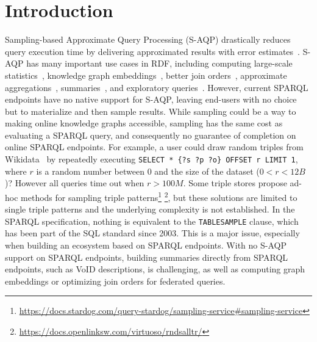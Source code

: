 
\section{Introduction}

Sampling-based Approximate Query Processing (S-AQP) drastically reduces query
execution time by delivering approximated results with error
estimates~\cite{DBLP:conf/sigmod/AgarwalMKTJMMS14}. S-AQP has many important use cases in RDF, including
computing large-scale statistics~\cite{soulet2019anytime,10.1007/978-3-319-18818-8_14},
knowledge graph embeddings~\cite{ristoski2016rdf2vec}, better join
orders~\cite{DBLP:conf/cidr/LeisRGK017},
approximate aggregations~\cite{wang2022approximate},
summaries~\cite{10.1007/978-3-030-49461-2_10}, and exploratory
queries~\cite{DBLP:conf/sigmod/AgarwalMKTJMMS14}.
%
However, current SPARQL endpoints have no native support for S-AQP,
leaving end-users with no choice but to materialize and then sample
results. While sampling could be a way to making online knowledge
graphs accessible, sampling has the same cost as evaluating a SPARQL
query, and consequently no guarantee of completion on online SPARQL endpoints.
%
For example, a user could draw random triples from Wikidata~\cite{soulet2019anytime}
by repeatedly executing \verb|SELECT * {?s ?p ?o} OFFSET r LIMIT 1|,
where $r$ is a random number between $0$ and
the size of the dataset ($0<r<12B$)? However all queries time out when $r > 100M$.
Some triple stores propose ad-hoc methods for sampling
triple patterns\footnote{\url{https://docs.stardog.com/query-stardog/sampling-service\#sampling-service}}
\footnote{\url{https://docs.openlinksw.com/virtuoso/rndsalltr/}},
but these solutions are limited to single triple patterns and the
underlying complexity is not established. In the SPARQL specification, nothing is
equivalent to the \texttt{TABLESAMPLE} clause, which has been part of the SQL
standard since 2003. This is a major issue, especially when building an ecosystem based on SPARQL endpoints. With no S-AQP support
on SPARQL endpoints, building summaries directly from SPARQL endpoints, such as VoID descriptions, is challenging, as well as computing graph
embeddings or optimizing join orders for federated queries. %

